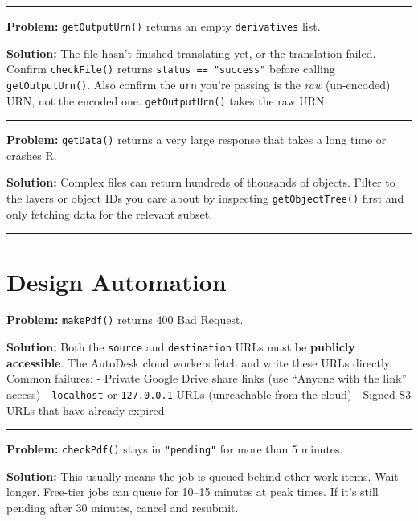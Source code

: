 \documentclass[
  11pt,
  letterpaper,
  DIV=11,
  numbers=noendperiod]{scrreprt}
\begin{document}
\begin{center}\rule{0.5\linewidth}{0.5pt}\end{center}

\textbf{Problem:} \texttt{getOutputUrn()} returns an empty
\texttt{derivatives} list.

\textbf{Solution:} The file hasn't finished translating yet, or the
translation failed. Confirm \texttt{checkFile()} returns
\texttt{status\ ==\ "success"} before calling \texttt{getOutputUrn()}.
Also confirm the \texttt{urn} you're passing is the \emph{raw}
(un-encoded) URN, not the encoded one. \texttt{getOutputUrn()} takes the
raw URN.

\begin{center}\rule{0.5\linewidth}{0.5pt}\end{center}

\textbf{Problem:} \texttt{getData()} returns a very large response that
takes a long time or crashes R.

\textbf{Solution:} Complex files can return hundreds of thousands of
objects. Filter to the layers or object IDs you care about by inspecting
\texttt{getObjectTree()} first and only fetching data for the relevant
subset.

\begin{center}\rule{0.5\linewidth}{0.5pt}\end{center}

\section{Design Automation}\label{design-automation-2}

\textbf{Problem:} \texttt{makePdf()} returns 400 Bad Request.

\textbf{Solution:} Both the \texttt{source} and \texttt{destination}
URLs must be \textbf{publicly accessible}. The AutoDesk cloud workers
fetch and write these URLs directly. Common failures: - Private Google
Drive share links (use ``Anyone with the link'' access) -
\texttt{localhost} or \texttt{127.0.0.1} URLs (unreachable from the
cloud) - Signed S3 URLs that have already expired

\begin{center}\rule{0.5\linewidth}{0.5pt}\end{center}

\textbf{Problem:} \texttt{checkPdf()} stays in \texttt{"pending"} for
more than 5 minutes.

\textbf{Solution:} This usually means the job is queued behind other
work items. Wait longer. Free-tier jobs can queue for 10--15 minutes at
peak times. If it's still pending after 30 minutes, cancel and resubmit.
\end{document}
